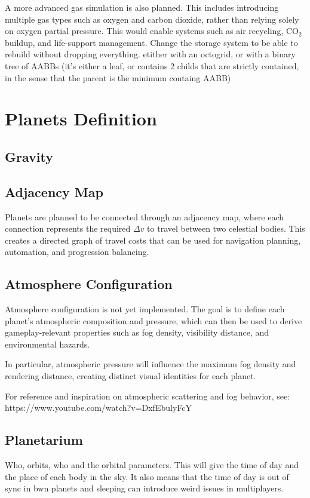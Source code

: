 \documentclass{article}
\begin{document}
A more advanced gas simulation is also planned. This includes introducing multiple gas types such as oxygen and carbon dioxide, rather than relying solely on oxygen partial pressure. This would enable systems such as air recycling, CO$_2$ buildup, and life-support management.
Change the storage system to be able to rebuild without dropping everything.
etither with an octogrid, or with a binary tree of AABBs (it's either a leaf, or contains 2 childs that are strictly contained, in the sense that the parent is the minimum containg AABB)

\section{Planets Definition}

\subsection{Gravity}



\subsection{Adjacency Map}

Planets are planned to be connected through an adjacency map, where each connection represents the required $\Delta v$ to travel between two celestial bodies. This creates a directed graph of travel costs that can be used for navigation planning, automation, and progression balancing.

\subsection{Atmosphere Configuration}

Atmosphere configuration is not yet implemented. The goal is to define each planet's atmospheric composition and pressure, which can then be used to derive gameplay-relevant properties such as fog density, visibility distance, and environmental hazards.

In particular, atmospheric pressure will influence the maximum fog density and rendering distance, creating distinct visual identities for each planet.

For reference and inspiration on atmospheric scattering and fog behavior, see:
https://www.youtube.com/watch?v=DxfEbulyFcY

\subsection{Planetarium}
Who, orbits, who and the orbital parameters. This will give the time of day and the place of each body in the sky. It also means that the time of day is out of sync in bwn planets and sleeping can introduce weird issues in multiplayers.
\end{document}
